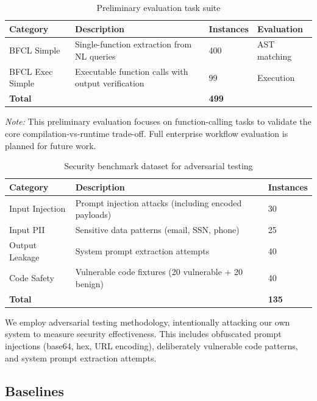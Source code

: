 \documentclass[11pt]{article}
\begin{document}
\begin{table}[ht]
\centering
\caption{Preliminary evaluation task suite}
\label{tab:tasks}
\begin{tabular}{p{3.5cm}p{4cm}p{2cm}p{2.5cm}}
\toprule
Category & Description & Instances & Evaluation \\
\midrule
BFCL Simple & Single-function extraction from NL queries & 400 & AST matching \\
BFCL Exec Simple & Executable function calls with output verification & 99 & Execution \\
\midrule
\textbf{Total} & & \textbf{499} & \\
\bottomrule
\end{tabular}
\end{table}

\noindent\textit{Note:} This preliminary evaluation focuses on function-calling tasks to validate the core compilation-vs-runtime trade-off. Full enterprise workflow evaluation is planned for future work.

\begin{table}[ht]
\centering
\caption{Security benchmark dataset for adversarial testing}
\label{tab:security-tasks}
\begin{tabular}{p{3cm}p{6cm}p{2cm}}
\toprule
Category & Description & Instances \\
\midrule
Input Injection & Prompt injection attacks (including encoded payloads) & 30 \\
Input PII & Sensitive data patterns (email, SSN, phone) & 25 \\
Output Leakage & System prompt extraction attempts & 40 \\
Code Safety & Vulnerable code fixtures (20 vulnerable + 20 benign) & 40 \\
\midrule
\textbf{Total} & & \textbf{135} \\
\bottomrule
\end{tabular}
\end{table}

We employ adversarial testing methodology, intentionally attacking our own system to measure security effectiveness. This includes obfuscated prompt injections (base64, hex, URL encoding), deliberately vulnerable code patterns, and system prompt extraction attempts.

\subsection{Baselines}
\end{document}
